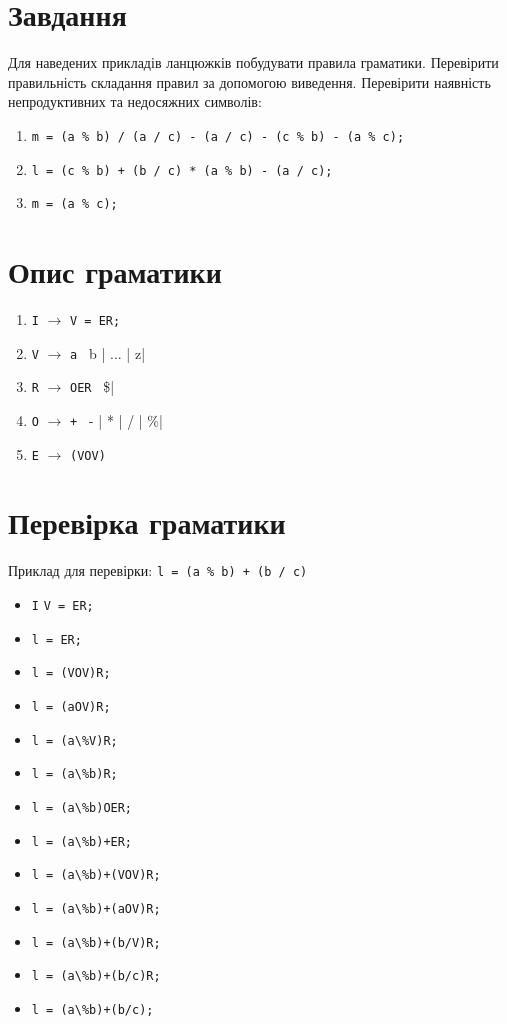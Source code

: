 \section{Завдання}
Для наведених прикладів ланцюжків побудувати правила граматики.
Перевірити правильність складання правил за допомогою виведення.
Перевірити наявність непродуктивних та недосяжних символів:
\begin{enumerate}
    \item \verb|m = (a % b) / (a / c) - (a / c) - (c % b) - (a % c);|
    \item \verb|l = (c % b) + (b / c) * (a % b) - (a / c);|
    \item \verb|m = (a % c);|
\end{enumerate}


\section{Опис граматики}
\begin{enumerate}
    \item \verb|I| $\to$ \verb|V = ER;|
    \item \verb|V| $\to$ \verb|a | b | ... | z|
    \item \verb|R| $\to$ \verb|OER | \$|
    \item \verb|O| $\to$ \verb|+ | - | * | / | \%|
    \item \verb|E| $\to$ \verb|(VOV)|
\end{enumerate}


\section{Перевірка граматики}
Приклад для перевірки: \verb|l = (a % b) + (b / c)|

\begin{itemize}
    \item[]  \verb|I|
              \verb|V = ER;|
    \item[]   \verb|l = ER;|
    \item[]   \verb|l = (VOV)R;|
    \item[]   \verb|l = (aOV)R;|
    \item[]   \verb|l = (a\%V)R;|
    \item[]   \verb|l = (a\%b)R;|
    \item[]   \verb|l = (a\%b)OER;|
    \item[]   \verb|l = (a\%b)+ER;|
    \item[]   \verb|l = (a\%b)+(VOV)R;|
    \item[]   \verb|l = (a\%b)+(aOV)R;|
    \item[]   \verb|l = (a\%b)+(b/V)R;|
    \item[]   \verb|l = (a\%b)+(b/c)R;|
    \item[]   \verb|l = (a\%b)+(b/c);|
\end{itemize}


